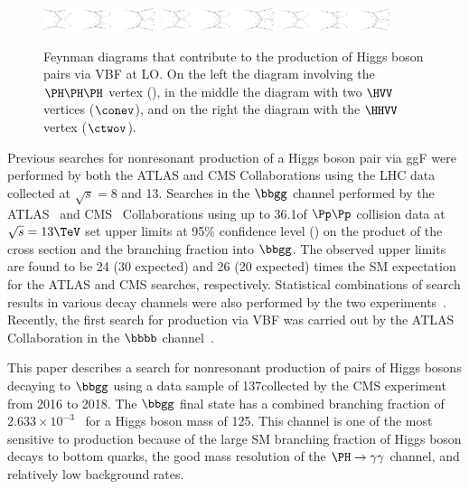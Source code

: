 \documentclass[11pt,a4paper,cmspaper,final,collab]{cms-tdr}
\begin{document}
\begin{figure}[hbt]
\centering
\includegraphics[width=0.3\textwidth]{Figure_002-a.pdf}      
\includegraphics[width=0.3\textwidth]{Figure_002-b.pdf}
\includegraphics[width=0.29\textwidth]{Figure_002-c.pdf}
\caption{Feynman diagrams that contribute to the production of Higgs boson pairs via VBF at LO. On the left the diagram involving the $\PH\PH\PH$ vertex (\lbdHHH), in the middle the diagram with two $\HVV$ vertices ($\conev$), and on the right the diagram with the $\HHVV$ vertex ($\ctwov$).\label{fig:diavbf}}
\end{figure}

Previous searches for nonresonant production of a Higgs boson pair via ggF were performed by both the ATLAS and CMS Collaborations using the LHC data collected at $\sqrt{s}=8$ and 13\TeV \cite{Aad:2014yja, Aad:2015uka, Aad:2015xja, Aaboud:2016xco,Aad:2019uzh,Khachatryan:2016sey,Aaboud:2018ftw,Aad:2019uzh,Sirunyan:2017tqo, Sirunyan:2017djm, Sirunyan:2017guj,Sirunyan:2018iwt}. Searches in the $\bbgg$ channel performed by the ATLAS~\cite{Aaboud:2018ftw} and CMS~\cite{Sirunyan:2018iwt} Collaborations using up to 36.1\fbinv of $\Pp\Pp$ collision data at $\sqrt{s}=13\TeV$ set upper limits at 95\% confidence level (\CL) on the product of the \HH cross section and the branching fraction into $\bbgg$. The observed upper limits are found to be 24 (30 expected) and 26 (20 expected) times the SM expectation for the ATLAS and CMS searches, respectively.
Statistical combinations of search results in various decay
channels were also performed by the two experiments~\cite{Aad:2019uzh,Sirunyan:2018ayu}. 
Recently, the first search for \HH production via VBF was carried out by the ATLAS Collaboration in the $\bbbb$ channel~\cite{Aad:2020kub}. 

This paper describes a search for nonresonant
production of pairs of Higgs bosons decaying to $\bbgg$
using a data sample of 137\fbinv collected by the CMS experiment from 2016 to 2018.
The $\bbgg$ final state has a combined branching fraction of $2.633\times 10^{-3}$~\cite{deFlorian:2016spz} for a Higgs boson mass of 125\GeV.
This channel is one of the most sensitive to \HH production because of the large SM branching fraction of Higgs boson decays to bottom quarks, the good mass resolution of the $\PH \to \gamma \gamma$ channel, and relatively low background rates.
\end{document}
